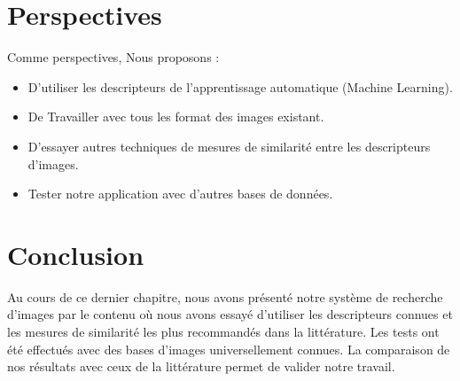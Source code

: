 \section{Perspectives}
Comme perspectives, Nous proposons :
\begin{itemize}
	\item D’utiliser les descripteurs de l'apprentissage automatique (Machine Learning).
	
	\item De Travailler avec tous les format des images existant.
	\item D’essayer autres techniques de mesures de similarité entre les descripteurs
	d’images.
    \item Tester notre application avec d’autres bases de données.
\end{itemize}
\section{Conclusion}
Au cours de ce dernier chapitre, nous avons présenté notre système de recherche d’images par le contenu où nous avons essayé d’utiliser les descripteurs connues et les mesures de similarité les plus recommandés dans la littérature. Les tests ont été effectués avec des bases d’images universellement connues. La comparaison de nos résultats avec ceux de la littérature permet de valider notre travail.